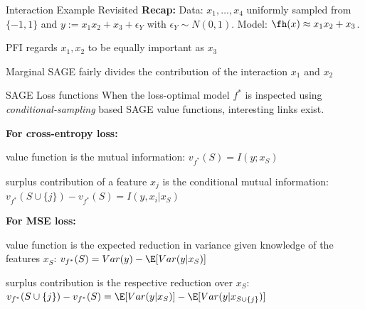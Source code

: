\documentclass[10pt,compress,t,notes=noshow, xcolor=table]{beamer}
\begin{document}
\begin{framev}[align=top]{Interaction Example Revisited}
\textbf{Recap:} Data: $x_1, \dots, x_4$ uniformly sampled from $\{-1, 1\}$ and $y:= x_1 x_2 + x_3 + \epsilon_Y$ with $\epsilon_Y \sim N(0, 1)$. Model: $\fh(x) \approx x_1 x_2 + x_3$.\\
%
%
\begin{itemizeM}
\item PFI regards $x_1, x_2$ to be equally important as $x_3$
\item Marginal SAGE fairly divides the contribution of the interaction $x_1$ and $x_2$
\end{itemizeM}
\end{framev}


\begin{framev}[align=top]{SAGE Loss functions}
When the loss-optimal model $f^*$ is inspected using \textit{conditional-sampling} based SAGE value functions, interesting links exist.
\spacer[0.5]
\pause

\textbf{For cross-entropy loss:}
\begin{itemizeM}
\item value function is the mutual information: $v_{f^*}(S) = I(y;x_S)$
\item surplus contribution of a feature $x_j$ is the conditional mutual information: $v_{f^*}(S \cup \{j\}) - v_{f^*}(S) = I(y,x_i|x_S)$
\end{itemizeM}
\spacer[0.5]
\pause

\textbf{For MSE loss:}
\begin{itemizeM}
\item value function is the expected reduction in variance given knowledge of the features $x_S$: $v_{f^*}(S) = Var(y) - \E[Var(y|x_S)]$
\item surplus contribution is the respective reduction over $x_S$:
$v_{f^*}(S \cup \{j\}) - v_{f^*}(S) = \E[Var(y|x_S)] - \E[Var(y|x_{S \cup \{j\}})]$
\end{itemizeM}
\end{framev}
\end{document}

